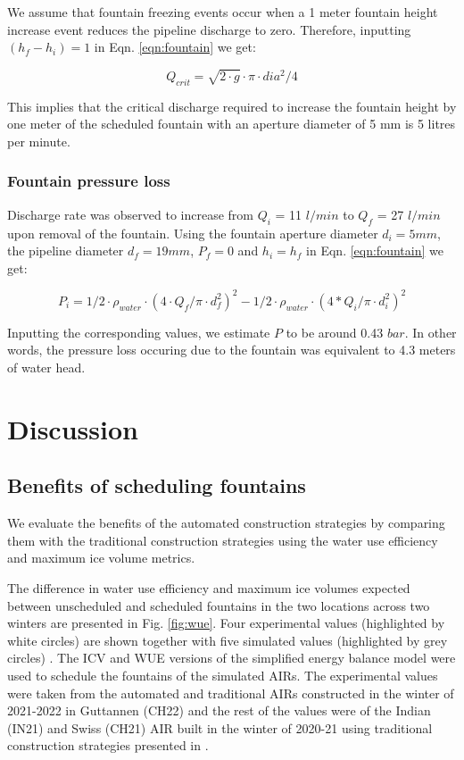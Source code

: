 \documentclass[tc, manuscript]{copernicus}
\begin{document}
We assume that fountain freezing events occur when a 1 meter fountain height increase event reduces the pipeline
discharge to zero. Therefore, inputting $(h_f - h_i) = 1$ in Eqn. \ref{eqn:fountain} we get: 

\begin{equation}
  \label{eqn:fountain_min}
  Q_{crit} = \sqrt{2 \cdot g } \cdot \pi \cdot dia^2/4
\end{equation}

This implies that the critical discharge required to increase the fountain height by one meter of the scheduled
fountain with an aperture diameter of 5 mm is 5 litres per minute.


\subsubsection{Fountain pressure loss}

Discharge rate was observed to increase from $Q_{i}$ = 11 $l/min$ to $Q_{f}$ = 27 $l/min$ upon removal of the
fountain. Using the fountain aperture diameter $d_i = 5 mm$, the pipeline diameter $d_f = 19 mm$, $P_{f} = 0$
and $h_{i} = h_{f}$ in Eqn. \ref{eqn:fountain} we get: 

\begin{equation}
  P_{i} = 1/2 \cdot \rho_{water} \cdot (4 \cdot Q_f/\pi \cdot d_f^2)^2 - 1/2 \cdot \rho_{water} \cdot (4 * Q_i/\pi \cdot d_i^2)^2
\end{equation}

Inputting the corresponding values, we estimate $P$ to be around 0.43 $bar$. In other words, the pressure loss
occuring due to the fountain was equivalent to 4.3 meters of water head.

\section{Discussion}

\subsection{Benefits of scheduling fountains}

We evaluate the benefits of the automated construction strategies by comparing them with the traditional
construction strategies using the water use efficiency and maximum ice volume metrics. 

The difference in water use efficiency and maximum ice volumes expected between unscheduled and scheduled
fountains in the two locations across two winters are presented in Fig. \ref{fig:wue}. Four experimental values
(highlighted by white circles) are shown together with five simulated values (highlighted by grey circles) . The
ICV and WUE versions of the simplified energy balance model were used to schedule the fountains of the simulated
AIRs. The experimental values were taken from the automated and traditional AIRs constructed in the winter of
2021-2022 in Guttannen (CH22) and the rest of the values were of the Indian (IN21) and Swiss (CH21) AIR built in
the winter of 2020-21 using traditional construction strategies presented in
\cite{balasubramanianInfluenceMeteorologicalConditions2022}. 
\end{document}
